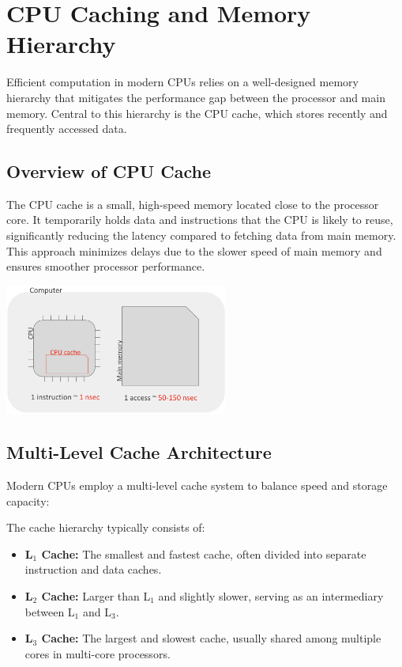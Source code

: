 \section{CPU Caching and Memory Hierarchy}
Efficient computation in modern CPUs relies on a well-designed memory hierarchy that mitigates the performance gap between the processor and main memory. Central to this hierarchy is the CPU cache, which stores recently and frequently accessed data.

\subsection{Overview of CPU Cache}
The CPU cache is a small, high-speed memory located close to the processor core. It temporarily holds data and instructions that the CPU is likely to reuse, significantly reducing the latency compared to fetching data from main memory. This approach minimizes delays due to the slower speed of main memory and ensures smoother processor performance.
\begin{center}
  \includegraphics[width=0.55\textwidth]{chapters/L4/images/cpu-cache.png}
\end{center}

\subsection{Multi-Level Cache Architecture}
Modern CPUs employ a multi-level cache system to balance speed and storage capacity:

\begin{definition}
The cache hierarchy typically consists of:
\begin{itemize}
    \item \textbf{L\(_1\) Cache:} The smallest and fastest cache, often divided into separate instruction and data caches.
    \item \textbf{L\(_2\) Cache:} Larger than L\(_1\) and slightly slower, serving as an intermediary between L\(_1\) and L\(_3\).
    \item \textbf{L\(_3\) Cache:} The largest and slowest cache, usually shared among multiple cores in multi-core processors.
\end{itemize}
\end{definition}

